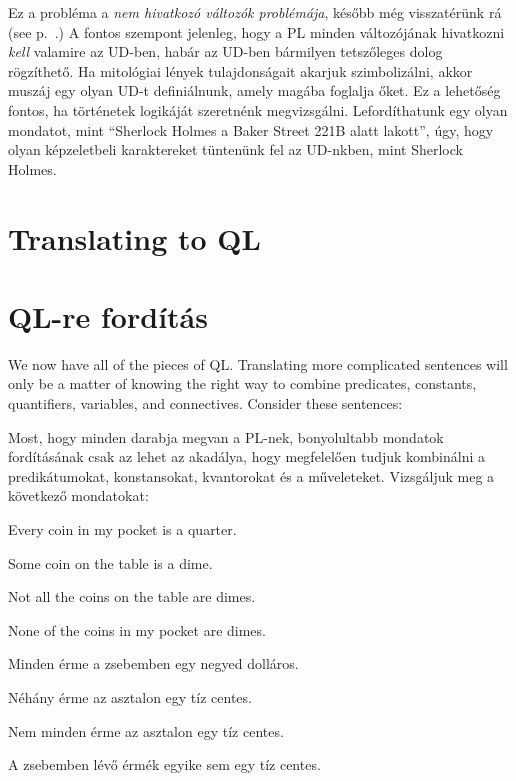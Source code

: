 Ez a probléma a \emph{nem hivatkozó változók problémája}, később még visszatérünk rá (see p.~\pageref{subsec.defdesc}.) A fontos szempont jelenleg, hogy a PL minden változójának hivatkozni \emph{kell} valamire az UD-ben, habár az UD-ben bármilyen tetszőleges dolog rögzíthető. Ha mitológiai lények tulajdonságait akarjuk szimbolizálni, akkor muszáj egy olyan UD-t definiálnunk, amely magába foglalja őket. Ez a lehetőség fontos, ha történetek logikáját szeretnénk megvizsgálni. Lefordíthatunk egy olyan mondatot, mint “Sherlock Holmes a Baker Street 221B alatt lakott”, úgy, hogy olyan képzeletbeli karaktereket tüntenünk fel az UD-nkben, mint Sherlock Holmes.

\section*{Translating to QL}
\section{QL-re fordítás}
We now have all of the pieces of QL. Translating more complicated sentences will only be a matter of knowing the right way to combine predicates, constants, quantifiers, variables, and connectives. Consider these sentences:

Most, hogy minden darabja megvan a PL-nek, bonyolultabb mondatok fordításának csak az lehet az akadálya, hogy megfelelően tudjuk kombinálni a predikátumokat, konstansokat, kvantorokat és a műveleteket. Vizsgáljuk meg a következő mondatokat: 

\begin{earg}
\item[\ex{quan1}] Every coin in my pocket is a quarter.
\item[\ex{quan2}] Some coin on the table is a dime.
\item[\ex{quan3}] Not all the coins on the table are dimes.
\item[\ex{quan4}] None of the coins in my pocket are dimes.
\end{earg}

\begin{earg}
\item[\ex{quan1}] Minden érme a zsebemben egy negyed dolláros.
\item[\ex{quan2}] Néhány érme az asztalon egy tíz centes.
\item[\ex{quan3}] Nem minden érme az asztalon egy tíz centes. 
\item[\ex{quan4}] A zsebemben lévő érmék egyike sem egy tíz centes.
\end{earg}


